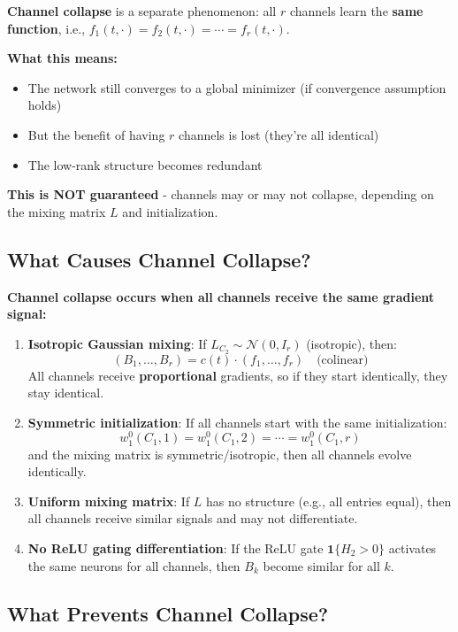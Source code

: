\textbf{Channel collapse} is a separate phenomenon: all $r$ channels learn the \textbf{same function}, i.e., $f_1(t, \cdot) = f_2(t, \cdot) = \cdots = f_r(t, \cdot)$.

\textbf{What this means:}
\begin{itemize}
\item The network still converges to a global minimizer (if convergence assumption holds)
\item But the benefit of having $r$ channels is lost (they're all identical)
\item The low-rank structure becomes redundant
\end{itemize}

\textbf{This is NOT guaranteed} - channels may or may not collapse, depending on the mixing matrix $L$ and initialization.

\subsection{What Causes Channel Collapse?}

\textbf{Channel collapse occurs when all channels receive the same gradient signal:}

\begin{enumerate}
\item \textbf{Isotropic Gaussian mixing}: If $L_{C_2} \sim \mathcal{N}(0, I_r)$ (isotropic), then:
   \[
   (B_1, \ldots, B_r) = c(t) \cdot (f_1, \ldots, f_r) \quad \text{(colinear)}
   \]
   All channels receive \textbf{proportional} gradients, so if they start identically, they stay identical.

\item \textbf{Symmetric initialization}: If all channels start with the same initialization:
   \[
   w_1^0(C_1, 1) = w_1^0(C_1, 2) = \cdots = w_1^0(C_1, r)
   \]
   and the mixing matrix is symmetric/isotropic, then all channels evolve identically.

\item \textbf{Uniform mixing matrix}: If $L$ has no structure (e.g., all entries equal), then all channels receive similar signals and may not differentiate.

\item \textbf{No ReLU gating differentiation}: If the ReLU gate $\mathbf{1}\{H_2 > 0\}$ activates the same neurons for all channels, then $B_k$ become similar for all $k$.
\end{enumerate}

\subsection{What Prevents Channel Collapse?}


